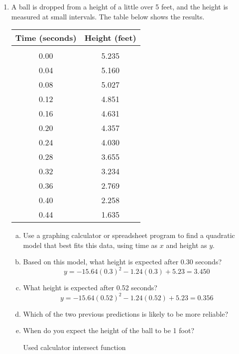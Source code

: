 \begin{enumerate}
\item A ball is dropped from a height of a little over 5 feet, and the height is measured at small intervals.  The table below shows the results.
\begin{center}
\begin{tabular}{c c}
\textbf{Time (seconds)} & \textbf{Height (feet)}\\
\hline
 & \\
0.00 & 5.235\\
0.04 & 5.160\\
0.08 & 5.027\\
0.12 & 4.851\\
0.16 & 4.631\\
0.20 & 4.357\\
0.24 & 4.030\\
0.28 & 3.655\\
0.32 & 3.234\\
0.36 & 2.769\\
0.40 & 2.258\\
0.44 & 1.635
\end{tabular}
\end{center}
\begin{enumerate}[(a)]
\item Use a graphing calculator or spreadsheet program to find a quadratic model that best fits this data, using time as $x$ and height as $y$. 
\item Based on this model, what height is expected after 0.30 seconds? 
\[y = -15.64(0.3)^2 - 1.24(0.3) + 5.23 = 3.450\]
\item What height is expected after 0.52 seconds? 
\[y = -15.64(0.52)^2 - 1.24(0.52) + 5.23 = 0.356\]
\item Which of the two previous predictions is likely to be more reliable? 
\item When do you expect the height of the ball to be 1 foot? 
\begin{center}
Used calculator intersect function
\end{center}
\end{enumerate}


\end{enumerate}
